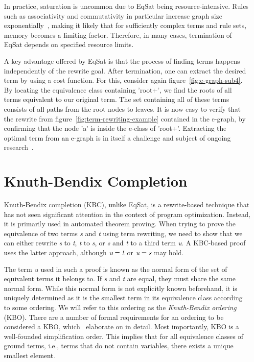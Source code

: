 In practice, saturation is uncommon due to EqSat being resource-intensive. Rules such as associativity and commutativity in particular increase graph size exponentially~\citep{zhang2023}, making it likely that for sufficiently complex terms and rule sets, memory becomes a limiting factor. Therefore, in many cases, termination of EqSat depends on specified resource limits.

A key advantage offered by EqSat is that the process of finding terms happens independently of the rewrite goal. After termination, one can extract the desired term by using a cost function. For this, consider again figure~\ref{fig:e-graph-sub4}. By locating the equivalence class containing 'root+', we find the roots of all terms equivalent to our original term. The set containing all of these terms consists of all paths from the root nodes to leaves. It is now easy to verify that the rewrite from figure~\ref{fig:term-rewriting-example} contained in the e-graph, by confirming that the node 'a' is inside the e-class of 'root+'. Extracting the optimal term from an e-graph is in itself a challenge and subject of ongoing research~\citep{yin2025eboostboostedegraphextraction}.

\section{Knuth-Bendix Completion}
\label{sec:knuth-bendix-completion}

Knuth-Bendix completion (KBC), unlike EqSat, is a rewrite-based technique that has not seen significant attention in the context of program optimization. Instead, it is primarily used in automated theorem proving. When trying to prove the equivalence of two terms \emph{s} and \emph{t} using term rewriting, we need to show that we can either rewrite \emph{s} to \emph{t}, \emph{t} to \emph{s}, or \emph{s} and \emph{t} to a third term \emph{u}. A KBC-based proof uses the latter approach, although $\emph{u} = \emph{t}$ or $\emph{u} = \emph{s}$ may hold.

The term \emph{u} used in such a proof is known as the normal form of the set of equivalent terms it belongs to. If \emph{s} and \emph{t} are equal, they must share the same normal form. While this normal form is not explicitly known beforehand, it is uniquely determined as it is the smallest term in its equivalence class according to some ordering. We will refer to this ordering as the \emph{Knuth-Bendix ordering} (KBO). There are a number of formal requirements for an ordering to be considered a KBO, which~\cite{BaaderNipkow1998} elaborate on in detail. Most importantly, KBO is a well-founded simplification order. This implies that for all equivalence classes of ground terms, i.e., terms that do not contain variables, there exists a unique smallest element. 


